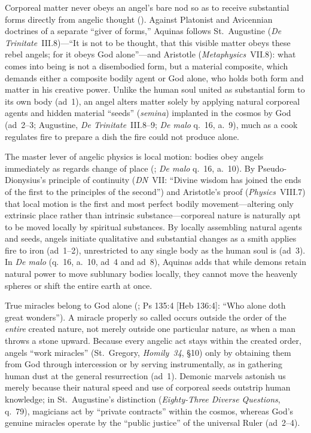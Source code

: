 Corporeal matter never obeys an angel's bare nod so as to receive substantial forms directly from angelic thought (). Against Platonist and Avicennian doctrines of a separate ``giver of forms,'' Aquinas follows St.~Augustine (\emph{De Trinitate}~III.8)---``It is not to be thought, that this visible matter obeys these rebel angels; for it obeys God alone''---and Aristotle (\emph{Metaphysics}~VII.8): what comes into being is not a disembodied form, but a material composite, which demands either a composite bodily agent or God alone, who holds both form and matter in his creative power. Unlike the human soul united as substantial form to its own body (ad~1), an angel alters matter solely by applying natural corporeal agents and hidden material ``seeds'' (\emph{semina}) implanted in the cosmos by God (ad~2--3; Augustine, \emph{De Trinitate}~III.8--9; \emph{De malo} q.~16, a.~9), much as a cook regulates fire to prepare a dish the fire could not produce alone.

The master lever of angelic physics is local motion: bodies obey angels immediately as regards change of place (; \emph{De malo} q.~16, a.~10). By Pseudo-Dionysius's principle of continuity (\emph{DN}~VII: ``Divine wisdom has joined the ends of the first to the principles of the second'') and Aristotle's proof (\emph{Physics}~VIII.7) that local motion is the first and most perfect bodily movement---altering only extrinsic place rather than intrinsic substance---corporeal nature is naturally apt to be moved locally by spiritual substances. By locally assembling natural agents and seeds, angels initiate qualitative and substantial changes as a smith applies fire to iron (ad~1--2), unrestricted to any single body as the human soul is (ad~3). In \emph{De malo} (q.~16, a.~10, ad~4 and ad~8), Aquinas adds that while demons retain natural power to move sublunary bodies locally, they cannot move the heavenly spheres or shift the entire earth at once.

True miracles belong to God alone (; Ps 135:4 [Heb 136:4]: ``Who alone doth great wonders''). A miracle properly so called occurs outside the order of the \emph{entire} created nature, not merely outside one particular nature, as when a man throws a stone upward. Because every angelic act stays within the created order, angels ``work miracles'' (St.~Gregory, \emph{Homily~34}, \S10) only by obtaining them from God through intercession or by serving instrumentally, as in gathering human dust at the general resurrection (ad~1). Demonic marvels astonish us merely because their natural speed and use of corporeal seeds outstrip human knowledge; in St.~Augustine's distinction (\emph{Eighty-Three Diverse Questions}, q.~79), magicians act by ``private contracts'' within the cosmos, whereas God's genuine miracles operate by the ``public justice'' of the universal Ruler (ad~2--4).

